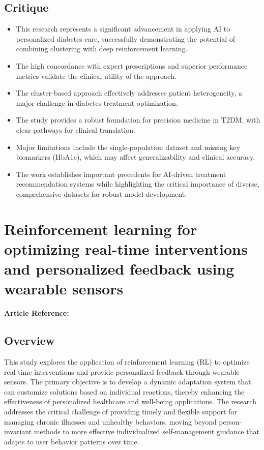 \subsection*{Critique}
\begin{itemize}
    \item This research represents a significant advancement in applying AI to personalized diabetes care, successfully demonstrating the potential of combining clustering with deep reinforcement learning.
    \item The high concordance with expert prescriptions and superior performance metrics validate the clinical utility of the approach.
    \item The cluster-based approach effectively addresses patient heterogeneity, a major challenge in diabetes treatment optimization.
    \item The study provides a robust foundation for precision medicine in T2DM, with clear pathways for clinical translation.
    \item Major limitations include the single-population dataset and missing key biomarkers (HbA1c), which may affect generalizability and clinical accuracy.
    \item The work establishes important precedents for AI-driven treatment recommendation systems while highlighting the critical importance of diverse, comprehensive datasets for robust model development.
\end{itemize}
\section{Reinforcement learning for optimizing real-time interventions and personalized feedback using wearable sensors}
\textbf{Article Reference:} \cite{tripathyReinforcementLearningOptimizing2024} 

\subsection*{Overview}
This study explores the application of reinforcement learning (RL) to optimize real-time interventions and provide personalized feedback through wearable sensors. The primary objective is to develop a dynamic adaptation system that can customize solutions based on individual reactions, thereby enhancing the effectiveness of personalized healthcare and well-being applications. The research addresses the critical challenge of providing timely and flexible support for managing chronic illnesses and unhealthy behaviors, moving beyond person-invariant methods to more effective individualized self-management guidance that adapts to user behavior patterns over time.

